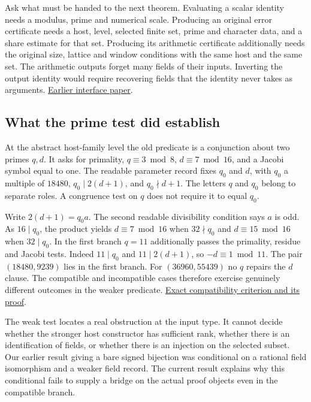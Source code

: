 \documentclass[12pt,letterpaper]{article}
\newcommand{\prior}[2]{\href{https://github.com/nousentllc/riemann-hypothesis/blob/90e46dd4be3b077bfed33fa64280eb9f306c9d87/research/uriel/experiments/fixed-datum-host-expanded/#1}{#2}}
\begin{document}
Ask what must be handed to the next theorem. Evaluating a scalar identity needs a modulus, prime and numerical scale. Producing an original error certificate needs a host, level, selected finite set, prime and character data, and a share estimate for that set. Producing its arithmetic certificate additionally needs the original size, lattice and window conditions with the same host and the same set. The arithmetic outputs forget many fields of their inputs. Inverting the output identity would require recovering fields that the identity never takes as arguments. \href{https://github.com/nousentllc/riemann-hypothesis/tree/01afc0f32e03a7da12ffd13d8eba867abc0f06e9/research/uriel/experiments/proof-interfaces-critical-edition}{Earlier interface paper}.

\subsection{What the prime test did establish}
At the abstract host-family level the old predicate is a conjunction about two primes $q,d$. It asks for primality, $q\equiv3\bmod8$, $d\equiv7\bmod16$, and a Jacobi symbol equal to one. The readable parameter record fixes $q_0$ and $d$, with $q_0$ a multiple of $18480$, $q_0\mid2(d+1)$, and $q_0\nmid d+1$. The letters $q$ and $q_0$ belong to separate roles. A congruence test on $q$ does not require it to equal $q_0$.

Write $2(d+1)=q_0 a$. The second readable divisibility condition says $a$ is odd. As $16\mid q_0$, the product yields $d\equiv7\bmod16$ when $32\nmid q_0$ and $d\equiv15\bmod16$ when $32\mid q_0$. In the first branch $q=11$ additionally passes the primality, residue and Jacobi tests. Indeed $11\mid q_0$ and $11\mid2(d+1)$, so $-d\equiv1\bmod11$. The pair $(18480,9239)$ lies in the first branch. For $(36960,55439)$ no $q$ repairs the $d$ clause. The compatible and incompatible cases therefore exercise genuinely different outcomes in the weaker predicate. \prior{RecoveryCriteria.lean}{Exact compatibility criterion and its proof}.

The weak test locates a real obstruction at the input type. It cannot decide whether the stronger host constructor has sufficient rank, whether there is an identification of fields, or whether there is an injection on the selected subset. Our earlier result giving a bare signed bijection was conditional on a rational field isomorphism and a weaker field record. The current result explains why this conditional fails to supply a bridge on the actual proof objects even in the compatible branch.
\end{document}
